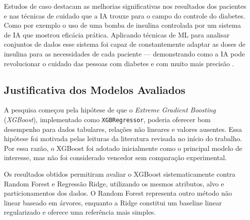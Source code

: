 \documentclass[12pt,a4paper]{article}
\begin{document}
Estudos de caso destacam as melhorias significativas nos resultados dos pacientes e nas técnicas de cuidado que a IA trouxe para o campo do controle do diabetes. Como por exemplo o uso de uma bomba de insulina controlada por um sistema de IA que mostrou eficácia prática. Aplicando técnicas de ML para analisar conjuntos de dados esse sistema foi capaz de constantemente adaptar as doses de insulina para as necessidades de cada paciente — demonstrando como a IA pode revolucionar o cuidado das pessoas com diabetes e com muito mais precisão \cite{alsamhori2025}.

\subsection{Justificativa dos Modelos Avaliados}
A pesquisa começou pela hipótese de que o \textit{Extreme Gradient Boosting}
(\textit{XGBoost}), implementado como \texttt{XGBRegressor}, poderia oferecer
bom desempenho para dados tabulares, relações não lineares e valores ausentes.
Essa hipótese foi motivada pelas leituras da literatura revisada no início do
trabalho. Por essa razão, o XGBoost foi adotado inicialmente como o principal
modelo de interesse, mas não foi considerado vencedor sem comparação
experimental.

Os resultados obtidos permitiram avaliar o XGBoost sistematicamente contra
Random Forest e Regressão Ridge, utilizando os mesmos atributos, alvo e
particionamentos dos dados. O Random Forest representa outro método não linear
baseado em árvores, enquanto a Ridge constitui um baseline linear regularizado
e oferece uma referência mais simples.
\end{document}
